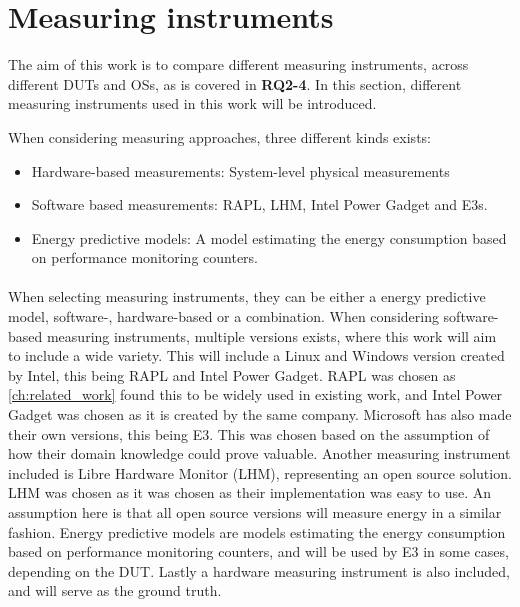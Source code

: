 \section{Measuring instruments}\label{sec:measuring_instruments}

The aim of this work is to compare different measuring instruments, across different DUTs and OSs, as is covered in \textbf{RQ2-4}. In this section, different measuring instruments used in this work will be introduced.

When considering measuring approaches, three different kinds exists:

\begin{itemize}
    \item Hardware-based measurements: System-level physical measurements
    \item Software based measurements: RAPL, LHM, Intel Power Gadget and E3s.
    \item Energy predictive models: A model estimating the energy consumption based on performance monitoring counters.
\end{itemize}

\paragraph*{}
When selecting measuring instruments, they can be either a energy predictive model, software-, hardware-based or a combination. When considering software-based measuring instruments, multiple versions exists, where this work will aim to include a wide variety. This will include a Linux and Windows version created by Intel, this being RAPL and Intel Power Gadget. RAPL was chosen as \cref{ch:related_work} found this to be widely used in existing work, and Intel Power Gadget was chosen as it is created by the same company. Microsoft has also made their own versions, this being E3. This was chosen based on the assumption of how their domain knowledge could prove valuable. Another measuring instrument included is Libre Hardware Monitor (LHM), representing an open source solution. LHM was chosen as it was chosen as their implementation was easy to use. An assumption here is that all open source versions will measure energy in a similar fashion. Energy predictive models are models estimating the energy consumption based on performance monitoring counters, and will be used by E3 in some cases, depending on the DUT. Lastly a hardware measuring instrument is also included, and will serve as the ground truth.



